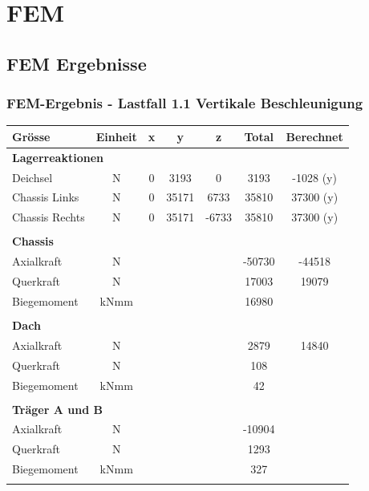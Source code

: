 \section{FEM}

\subsection{FEM Ergebnisse}
  \label{FEM Ergebnisse}

  \subsubsection{FEM-Ergebnis - Lastfall 1.1 Vertikale Beschleunigung}
  \begin{table}[H]
  \centering
  \begin{tabular}{lcccccc}
  Grösse	&	Einheit	&	x	&	y	&	z	&	Total	&	Berechnet	\\	\hline
  \multicolumn{5}{l}{\textbf{Lagerreaktionen}}									&		&		\\	\thickhline
  Deichsel	&	N	&	0	&	3193	&	0	&	3193	&	-1028	(y) \\
  Chassis Links	&	N	&	0	&	35171	&	6733	&	35810	&	37300 (y)	\\
  Chassis Rechts	&	N	&	0	&	35171	&	-6733	&	35810	&	37300 (y)	\\	\hline	\\
  \multicolumn{5}{l}{\textbf{Chassis}}									&		&		\\	\thickhline
  Axialkraft	&	N	&		&		&		&	-50730	&	-44518	\\
  Querkraft	&	N	&		&		&		&	17003	&	19079	\footnotemark \\
  Biegemoment	&	kNmm	&		&		&		&	16980	&		\\	\hline	\\
  \multicolumn{5}{l}{\textbf{Dach}}									&		&		\\	\thickhline
  Axialkraft	&	N	&		&		&		&	2879	&	14840	\\
  Querkraft	&	N	&		&		&		&	108	&		\\
  Biegemoment	&	kNmm	&		&		&		&	42	&		\\	\hline	\\
  \multicolumn{5}{l}{\textbf{Träger A und B}}													\\	\thickhline
  Axialkraft	&	N	&		&		&		&	-10904	&		\\
  Querkraft	&	N	&		&		&		&	1293	&		\\
  Biegemoment	&	kNmm	&		&		&		&	327	&		\\	\hline	\\

\end{tabular}
\end{table}

